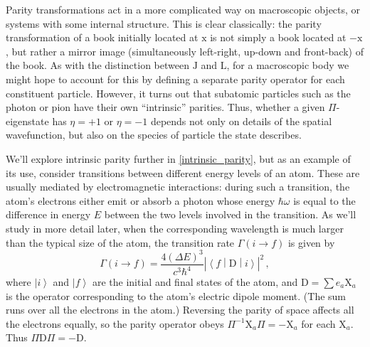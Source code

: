 \documentclass{article}
\theoremstyle{plain}\theoremheaderfont{\normalfont\itshape}\theorembodyfont{\rmfamily}\theoremseparator{.}\newtheorem*{rem}{Remark}\newtheorem*{ex}{Example}\newtheorem*{proof}{Proof}\newtheorem*{altp}{Alternative proof}
\theoremstyle{plain}\theoremheaderfont{\normalfont\bfseries}\theorembodyfont{\rmfamily}\theoremseparator{.}\newtheorem{thm}{Theorem}[section]\newtheorem{lem}[thm]{Lemma}\newtheorem{prop}[thm]{Proposition}\newtheorem*{cor}{Corollary}\newtheorem{defn}[thm]{Definition}\newtheorem{clm}[thm]{Claim}\newtheorem{clminproof}{Claim}
\theoremstyle{break}\theoremheaderfont{\normalfont\itshape}\theorembodyfont{\rmfamily}\theoremseparator{.\medskip}\newtheorem*{proofskip}{Proof}\newtheorem*{exs}{Examples}\newtheorem*{rems}{Remarks}
\theoremstyle{break}\theoremheaderfont{\normalfont\bfseries}\theorembodyfont{\rmfamily}\theoremseparator{.\medskip}\newtheorem{lemskip}[thm]{Lemma}\newtheorem{defnskip}[thm]{Definition}\newtheorem{propskip}[thm]{Proposition}\newtheorem{thmskip}[thm]{Theorem}
\numberwithin{equation}{section}
\newcommand{\ket}[1]{\left| #1 \right\rangle}
\newcommand{\mel}[3]{\left\langle #1 \middle| #2 \middle| #3 \right\rangle}
\newcommand{\vb}[1]{\bm{\mathrm{#1}}}
\newcommand{\abs}[1]{\left| #1 \right|}
\begin{document}
    Parity transformations act in a more complicated way on macroscopic objects, or systems with some internal structure. This is clear classically: the parity transformation of a book initially located at \(\vb{x}\) is not simply a book located at \(-\vb{x}\), but rather a mirror image (simultaneously left-right, up-down and front-back) of the book. As with the distinction between \(\vb{J}\) and \(\vb{L}\), for a macroscopic body we might hope to account for this by defining a separate parity operator for each constituent particle. However, it turns out that subatomic particles such as the photon or pion have their own ``intrinsic'' parities. Thus, whether a given \(\Pi\)-eigenstate has \(\eta=+1\) or \(\eta=-1\) depends not only on details of the spatial wavefunction, but also on the species of particle the state describes.
    
    We'll explore intrinsic parity further in \cref{intrinsic_parity}, but as an example of its use, consider transitions between different energy levels of an atom. These are usually mediated by electromagnetic interactions: during such a transition, the atom's electrons either emit or absorb a photon whose energy \(\hbar\omega\) is equal to the difference in energy \(E\) between the two levels involved in the transition. As we'll study in more detail later, when the corresponding wavelength is much larger than the typical size of the atom, the transition rate \(\Gamma(i\to f)\) is given by
    \begin{equation}
        \Gamma(i\to f)=\frac{4(\Delta E)^3}{c^3\hbar^4}\abs{\mel{f}{\vb{D}}{i}}^2\,,
    \end{equation}
    where \(\ket{i}\) and \(\ket{f}\) are the initial and final states of the atom, and \(\vb{D}=\sum e_a\vb{X}_a\) is the operator corresponding to the atom's electric dipole moment. (The sum runs over all the electrons in the atom.) Reversing the parity of space affects all the electrons equally, so the parity operator obeys \(\Pi^{-1}\vb{X}_a\Pi=-\vb{X}_a\) for each \(\vb{X}_a\). Thus \(\Pi\vb{D}\Pi=-\vb{D}\).
\end{document}
